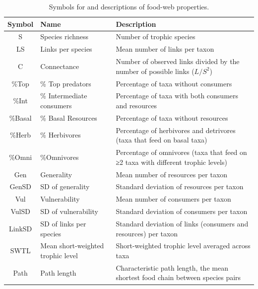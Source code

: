 \documentclass[12pt]{article}
\begin{document}
\begin{center}
\begin{table}[!h]
\caption{Symbols for and descriptions of food-web properties.}
\label{symboltable}
\begin{tabular}{c l l}
\hline
Symbol      & Name & Description \\
\hline
S & Species richness & Number of trophic species \\
LS & Links per species & Mean number of links per taxon \\
C & Connectance & Number of observed links divided by the number of possible links ($L/S^{2}$) \\
\%Top & \% Top predators & Percentage of taxa without consumers \\
\%Int & \% Intermediate consumers & Percentage of taxa with both consumers and resources \\
\%Basal & \% Basal Resources & Percentage of taxa without resources \\
\%Herb	& \% Herbivores	& Percentage of herbivores and detrivores (taxa that feed on basal taxa) \\
\%Omni & \%Omnivores & Percentage of omnivores (taxa that feed on ≥2 taxa with different trophic levels) \\
Gen & Generality & Mean number of resources per taxon \\
GenSD & SD of generality & Standard deviation of resources per taxon \\
Vul & Vulnerability & Mean number of consumers per taxon \\
VulSD & SD of vulnerability & Standard deviation of consumers per taxon \\
LinkSD & SD of links per species & Standard deviation of links (consumers and resources) per taxon \\
SWTL & Mean short-weighted trophic level & Short-weighted trophic level averaged across taxa \\
Path & Path length & Characteristic path length, the mean shortest food chain between species pairs \\
\hline
\end{tabular}
\end{table}
\end{center}
\end{document}
